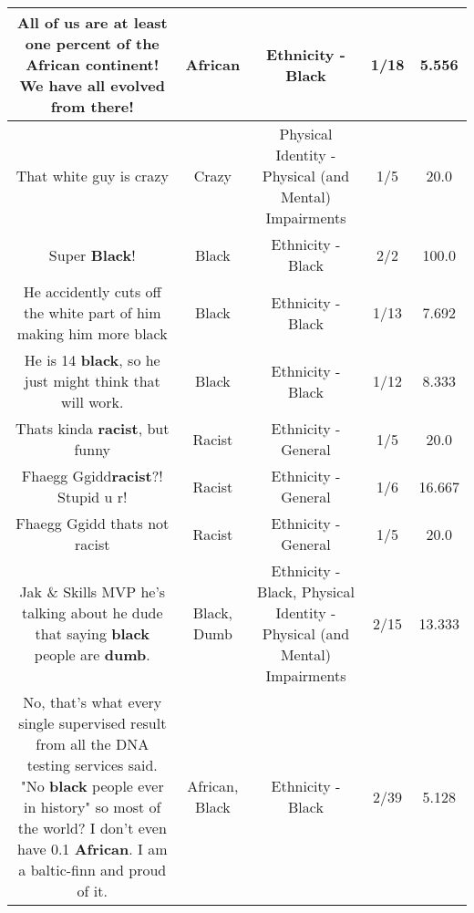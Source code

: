 \documentclass[11pt]{article}
\newlength\mylength
\begin{document}
\begin{center}
\begin{longtable}{|C{.65\mylength}|C{.30\mylength}|C{.12\mylength}|C{.12\mylength}|C{.12\mylength}|}
  \small All of us are at least one percent of the \textbf{African} continent! We have all evolved from there!\normalsize   & African & Ethnicity - Black & 1/18 & 5.556 \\  \hline
  \small That white guy is crazy\normalsize   & Crazy & Physical Identity - Physical (and Mental) Impairments & 1/5 & 20.0 \\  \hline
  \small Super \textbf{Black}!\normalsize   & Black & Ethnicity - Black & 2/2 & 100.0 \\  \hline
  \small He accidently cuts off the white part of him making him more black\normalsize   & Black & Ethnicity - Black & 1/13 & 7.692 \\  \hline
  \small He is 14 \textbf{black}, so he just might think that will work.\normalsize   & Black & Ethnicity - Black & 1/12 & 8.333 \\  \hline
  \small Thats kinda \textbf{racist}, but funny\normalsize   & Racist & Ethnicity - General & 1/5 & 20.0 \\  \hline
  \small Fhaegg Ggidd\textbf{racist}?! Stupid u r!\normalsize   & Racist & Ethnicity - General & 1/6 & 16.667 \\  \hline
  \small Fhaegg Ggidd thats not racist\normalsize   & Racist & Ethnicity - General & 1/5 & 20.0 \\  \hline
  \small Jak \& Skills MVP he's talking about he dude that saying \textbf{black} people are \textbf{dumb}.\normalsize   & Black, Dumb & Ethnicity - Black, Physical Identity - Physical (and Mental) Impairments & 2/15 & 13.333 \\  \hline
  \small No, that's what every single supervised result from all the DNA testing services said. "No \textbf{black} people ever in history" so most of the world? I don't even have 0.1 \textbf{African}. I am a baltic-finn and proud of it.\normalsize   & African, Black & Ethnicity - Black & 2/39 & 5.128 \\  \hline

\end{longtable}
\end{center}
\end{document}
